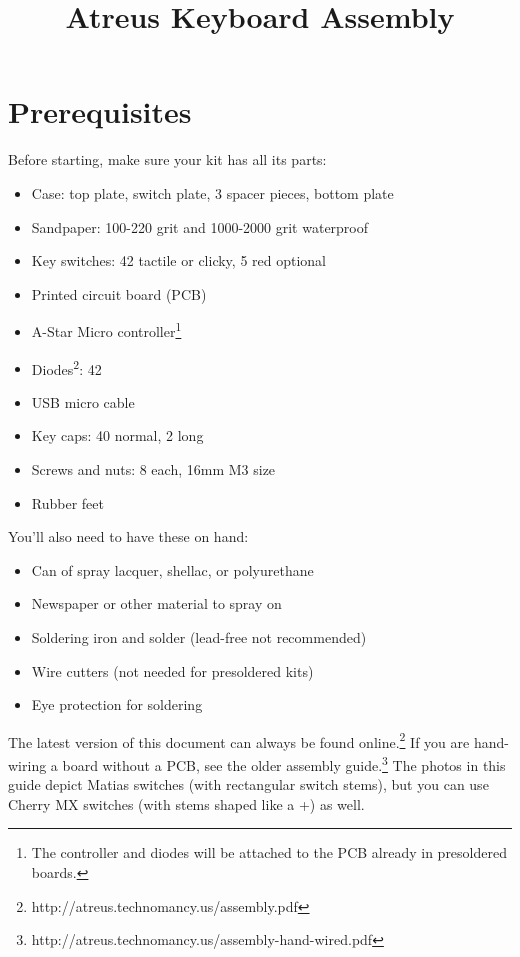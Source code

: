 \documentclass[landscape,twocolumn]{article}
\title{Atreus Keyboard Assembly}
\date{ }
\begin{document}
\setlength{\columnsep}{1.4cm}
\setlength{\parindent}{0cm}
\maketitle
\section{Prerequisites}

Before starting, make sure your kit has all its parts:

\begin{itemize}
\item Case: top plate, switch plate, 3 spacer pieces, bottom plate
\item Sandpaper: 100-220 grit and 1000-2000 grit waterproof
\item Key switches: 42 tactile or clicky, 5 red optional
\item Printed circuit board (PCB)
\item A-Star Micro controller\footnote{The controller and diodes will be
  attached to the PCB already in presoldered boards.}
\item Diodes\textsuperscript{2}: 42
\item USB micro cable
\item Key caps: 40 normal, 2 long
\item Screws and nuts: 8 each, 16mm M3 size
\item Rubber feet
\end{itemize}

You'll also need to have these on hand:

\begin{itemize}
\item Can of spray lacquer, shellac, or polyurethane
\item Newspaper or other material to spray on
\item Soldering iron and solder (lead-free not recommended)
\item Wire cutters (not needed for presoldered kits)
\item Eye protection for soldering
\end{itemize}

\vspace{1em}

The latest version of this document can always be found
online.\footnote{http://atreus.technomancy.us/assembly.pdf} If you are
hand-wiring a board without a PCB, see the older assembly
guide.\footnote{http://atreus.technomancy.us/assembly-hand-wired.pdf}
The photos in this guide depict Matias switches (with rectangular
switch stems), but you can use Cherry MX switches (with stems shaped
like a +) as well.
\end{document}
